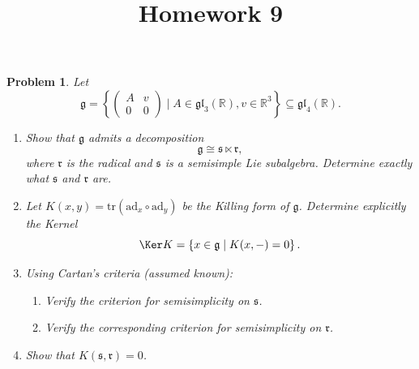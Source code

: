 \documentclass[11pt, letterpaper]{article}
\title{Homework 9}
\theoremstyle{plain}
\newtheorem{problem}{Problem}
\begin{document}
\makeproblem
\begin{problem}
Let
\[
	\mathfrak{g} =\left\{ \begin{pmatrix}
	A & v \\
	0 & 0
	\end{pmatrix} \mid A\in \mathfrak{gl} _3(\mathbb{R} ),v\in\mathbb{R} ^3 \right\} \subseteq \mathfrak{gl} _4(\mathbb{R} )
.\]
\begin{enumerate}
	\item Show that $\mathfrak{g} $ admits a decomposition
		\[
			\mathfrak{g} \cong \mathfrak{s} \ltimes \mathfrak{r} ,
		\]
		where $\mathfrak{r} $ is the radical and $\mathfrak{s} $ is a semisimple Lie subalgebra. Determine exactly what $\mathfrak{s} $ and $\mathfrak{r} $ are.
	\item Let $K(x,y)=\mathrm{tr} (\mathrm{ad} _x\circ \mathrm{ad} _y)$ be the Killing form of $\mathfrak{g} $. Determine explicitly the Kernel
		\[
			\Ker K = \left\{ x\in \mathfrak{g} \mid K(x,-)=0 \right\} 
		.\]
	\item Using Cartan's criteria (assumed known):
		\begin{enumerate}
			\item Verify the criterion for semisimplicity on $\mathfrak{s} $.
			\item Verify the corresponding criterion for semisimplicity on $\mathfrak{r} $.
		\end{enumerate}
	\item Show that $K(\mathfrak{s} ,\mathfrak{r} )=0$.
\end{enumerate}
\end{problem}
\end{document}
